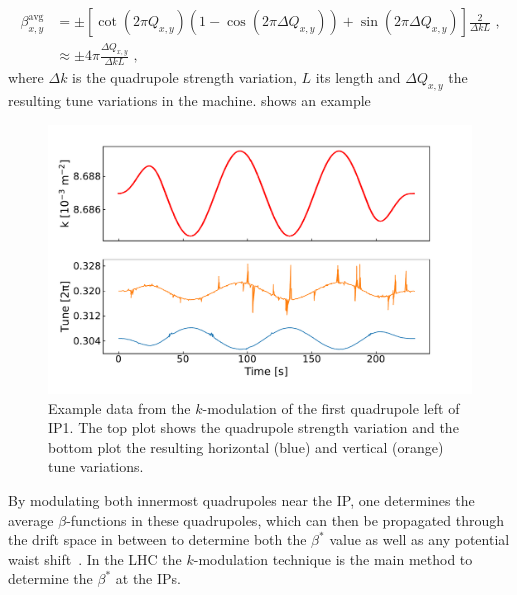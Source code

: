 \begin{equation}
  \begin{aligned}
    \beta^{\mathrm{avg}}_{x,y} & =\pm \left[ \cot \left(2 \pi Q_{x,y} \right) \left( 1 - \cos \left(2 \pi \Delta Q_{x,y} \right) \right) + \sin \left( 2 \pi \Delta Q_{x,y} \right) \right] \frac{2}{\Delta k L} \text{ ,}  \\
                               & \approx \pm 4 \pi \frac{\Delta Q_{x,y}}{\Delta k L} \text{ ,}
  \end{aligned}
  \label{equation:k_modulation_average_beta}
\end{equation}
where \(\Delta k\) is the quadrupole strength variation, \(L\) its length and \(\Delta Q_{x,y}\) the resulting tune variations in the machine.
 shows an example 

\begin{figure}[!htb]
  \centering
  \includegraphics*[width=0.99\linewidth]{Figures/Optics_Measurements_Corrections_at_LHC/k_modulation.pdf}
  \caption{Example data from the \(k\)-modulation of the first quadrupole left of IP\num{1}. The top plot shows the quadrupole strength variation and the bottom plot the resulting horizontal (\textcolor{mplblue}{blue}) and vertical (\textcolor{mplorange}{orange}) tune variations.}
  \label{figure:kmod_mqxa1l1}
\end{figure}

By modulating both innermost quadrupoles near the IP, one determines the average \(\beta\)-functions in these quadrupoles, which can then be propagated through the drift space in between to determine both the \(\beta^{\ast}\) value as well as any potential waist shift~\cite{PRAB:Carlier:K_Modulation_HL_LHC}.
In the LHC the \(k\)-modulation technique is the main method to determine the \(\beta^{\ast}\) at the IPs.

